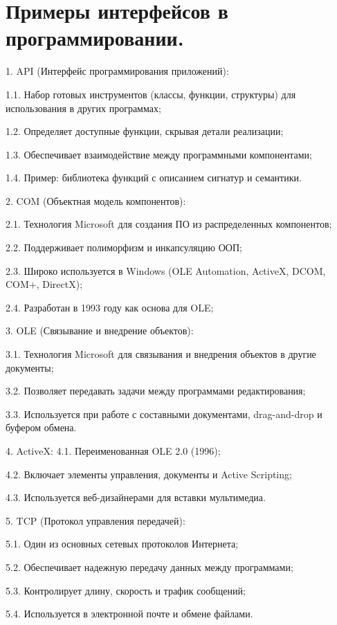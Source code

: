 \documentclass[14pt]{extarticle} %
\begin{document}
\section{Примеры интерфейсов в программировании.} \label{sec:thirteen}

1.	API (Интерфейс программирования приложений):

    1.1.	Набор готовых инструментов (классы, функции, структуры) для использования в других программах;
    
    1.2.	Определяет доступные функции, скрывая детали реализации;
    
    1.3.	Обеспечивает взаимодействие между программными компонентами;
    
    1.4.	Пример: библиотека функций с описанием сигнатур и семантики.
    
2.	COM (Объектная модель компонентов):

    2.1.	Технология Microsoft для создания ПО из распределенных компонентов;
    
    2.2.	Поддерживает полиморфизм и инкапсуляцию ООП;
    
    2.3.	Широко используется в Windows (OLE Automation, ActiveX, DCOM, COM+, DirectX);
    
    2.4.	Разработан в 1993 году как основа для OLE;
    
3.	OLE (Связывание и внедрение объектов):

    3.1.	Технология Microsoft для связывания и внедрения объектов в другие документы;
    
    3.2.	Позволяет передавать задачи между программами редактирования;
    
    3.3.	Используется при работе с составными документами, drag-and-drop и буфером обмена.
    
4.	ActiveX:
    4.1.	Переименованная OLE 2.0 (1996);
    
    4.2.	Включает элементы управления, документы и Active Scripting;
    
    4.3.	Используется веб-дизайнерами для вставки мультимедиа.
    
5.	TCP (Протокол управления передачей):

    5.1.	Один из основных сетевых протоколов Интернета;
    
    5.2.	Обеспечивает надежную передачу данных между программами;
    
    5.3.	Контролирует длину, скорость и трафик сообщений;
    
    5.4.	Используется в электронной почте и обмене файлами.
    
\end{document}
